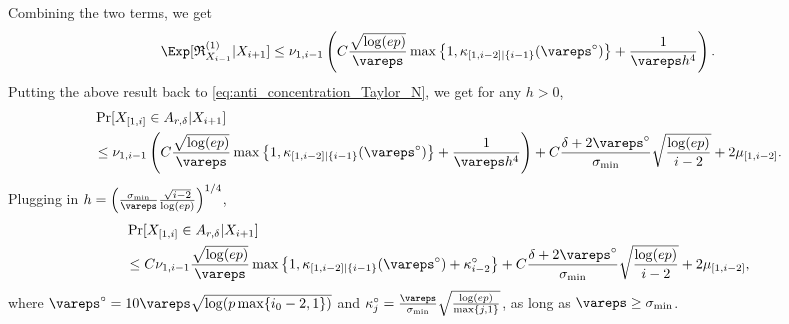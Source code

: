 \documentclass[aos]{imsart}
\begin{document}
\begin{appendix}
\begin{equation*}
\end{equation*}
Combining the two terms, we get
\begin{equation*}
\begin{aligned}
    \Exp[ \mathfrak{R}_{X_{i-1}}^{(1)} | X_{i+1} ] 
    \leq \nu_{1,i-1} \left( 
        C \frac{\sqrt{\log(ep)}}{\vareps} 
        \max\left\{1, \kappa_{[1,i-2]|\{i-1\}}(\vareps^\circ) \right\}
        + \frac{1}{\vareps h^4}
    \right).
\end{aligned}    
\end{equation*}
%
Putting the above result back to \cref{eq:anti_concentration_Taylor_N}, we get for any $h > 0$,
\begin{equation*}
\begin{aligned}
    & \Pr[X_{[1,i]} \in A_{r,\delta} | X_{i+1}] \\
    & \leq \nu_{1,i-1} \left( 
        C \frac{\sqrt{\log(ep)}}{\vareps} 
        \max\left\{1, \kappa_{[1,i-2]|\{i-1\}}(\vareps^\circ) \right\}
        + \frac{1}{\vareps h^4}
    \right)
    + C\frac{\delta + 2\vareps^\circ}{\sigma_{\min}} \sqrt{\frac{\log(ep)}{i-2}} + 2\mu_{[1,i-2]}.
\end{aligned} 
\end{equation*}
Plugging in $h = \left(\frac{\sigma_{\min}}{\vareps} \frac{\sqrt{i-2}}{\log(ep)} \right)^{1/4}$,
\begin{equation*}
\begin{aligned}
    & \Pr[X_{[1,i]} \in A_{r,\delta} | X_{i+1}] \\
    & \leq C \nu_{1,i-1}
    \frac{\sqrt{\log(ep)}}{\vareps} 
    \max\left\{1, \kappa_{[1,i-2]|\{i-1\}}(\vareps^\circ) + \kappa^\circ_{i-2} \right\}
    + C\frac{\delta + 2\vareps^\circ}{\sigma_{\min}} \sqrt{\frac{\log(ep)}{i-2}} + 2\mu_{[1,i-2]},
\end{aligned}
\end{equation*}
where $\vareps^\circ = 10\vareps\sqrt{\log(p\max\{i_0-2,1\})}$ and $\kappa^\circ_j = \frac{\vareps}{\sigma_{\min}} \sqrt{\frac{\log(ep)}{\max\{j,1\}}}$, as long as $\vareps \geq \sigma_{\min}$.
%

\end{appendix}
\end{document}

